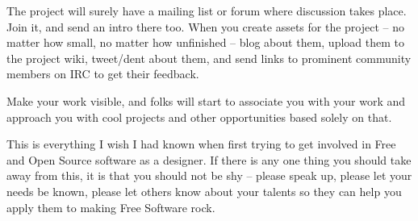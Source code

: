 The project will surely have a mailing list or forum where discussion takes
place. Join it, and send an intro there too. When you create assets for the
project -- no matter how small, no matter how unfinished -- blog about them,
upload them to the project wiki, tweet/dent about them, and send links to
prominent community members on IRC to get their feedback.

Make your work visible, and folks will start to associate you with your work and
approach you with cool projects and other opportunities based solely on that.


This is everything I wish I had known when first trying to get involved in Free
and Open Source software as a designer. If there is any one thing you should
take away from this, it is that you should not be shy -- please speak up, please
let your needs be known, please let others know about your talents so they can
help you apply them to making Free Software rock.
